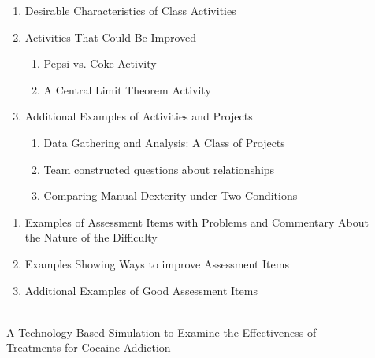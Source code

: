 \documentclass[twoside,openany]{tufte-book}
\begin{document}
\begin{description}
  \item[]\hfill
  \vspace{-.2in}
	\begin{enumerate}[leftmargin=1cm, itemsep=.2em]
	\item Desirable Characteristics of Class Activities
	\item Activities That Could Be Improved
		\begin{enumerate}[leftmargin=1cm, itemsep=.2em]
		\item Pepsi vs. Coke Activity
		\item A Central Limit Theorem Activity
		\end{enumerate}
	\item Additional Examples of Activities and Projects
		\begin{enumerate}[leftmargin=1cm, itemsep=.2em]
		\item Data Gathering and Analysis:  A Class of Projects
		\item Team constructed questions about relationships
		\item Comparing Manual Dexterity under Two Conditions\\
		\end{enumerate}
	\end{enumerate}
 
 \vspace{.25in}
\item[] \hfill
\vspace{-.2in}
	\begin{enumerate}[leftmargin=1cm, itemsep=.2em]
	\item Examples of Assessment Items with Problems and Commentary About the Nature of the Difficulty
	\item Examples Showing Ways to improve Assessment Items
	\item Additional Examples of Good Assessment Items\\
	\end{enumerate}
  
  \vspace{.25in}
\item[] \hfill \\
\vspace{-.1in}
A Technology-Based Simulation to Examine the Effectiveness of Treatments for Cocaine Addiction\\


\end{description}
\end{document}
